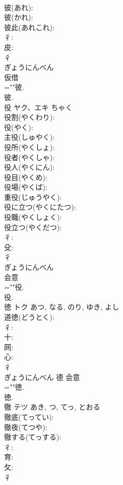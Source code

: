 \documentclass[8pt]{extreport}
\begin{document}
\begin{CJK}{UTF8}{min}
\\	彼(あれ): 
\\	彼(かれ): 
\\	彼此(あれこれ): 
\\	彳: 
\\	皮: 
\\	彳	
\\	ぎょうにんべん	
\\	仮借 
\\	=""彼.
\\	彼.
\\	役	ヤク、エキ		ちゃく	
\\	役割(やくわり): 
\\	役(やく): 
\\	主役(しゅやく): 
\\	役所(やくしょ): 
\\	役者(やくしゃ): 
\\	役人(やくにん): 
\\	役目(やくめ): 
\\	役場(やくば): 
\\	重役(じゅうやく): 
\\	役に立つ(やくにたつ): 
\\	役職(やくしょく): 
\\	役立つ(やくだつ): 
\\	彳: 
\\	殳: 
\\	彳	
\\	ぎょうにんべん	
\\	会意 
\\	=""役.
\\	役.
\\	徳	トク		あつ, なる, のり, ゆき, よし	
\\	道徳(どうとく): 
\\	彳: 
\\	十: 
\\	网: 
\\	心: 
\\	彳	
\\	ぎょうにんべん	德	会意 
\\	=""徳.
\\	徳.
\\	徹	テツ		あき, つ, てっ, とおる	
\\	徹底(てってい): 
\\	徹夜(てつや): 
\\	徹する(てっする): 
\\	彳: 
\\	育: 
\\	攵: 
\\	彳	

\end{CJK}
\end{document}
